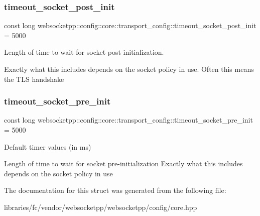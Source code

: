 \subsubsection{\texorpdfstring{timeout\+\_\+socket\+\_\+post\+\_\+init}{timeout\_socket\_post\_init}}
{\footnotesize\ttfamily const long websocketpp\+::config\+::core\+::transport\+\_\+config\+::timeout\+\_\+socket\+\_\+post\+\_\+init = 5000\hspace{0.3cm}{\ttfamily [static]}}



Length of time to wait for socket post-\/initialization. 

Exactly what this includes depends on the socket policy in use. Often this means the T\+LS handshake \mbox{\label{structwebsocketpp_1_1config_1_1core_1_1transport__config_ab35c5322043bee05f2a66444f41a9be9}} 
\subsubsection{\texorpdfstring{timeout\+\_\+socket\+\_\+pre\+\_\+init}{timeout\_socket\_pre\_init}}
{\footnotesize\ttfamily const long websocketpp\+::config\+::core\+::transport\+\_\+config\+::timeout\+\_\+socket\+\_\+pre\+\_\+init = 5000\hspace{0.3cm}{\ttfamily [static]}}



Default timer values (in ms) 

Length of time to wait for socket pre-\/initialization Exactly what this includes depends on the socket policy in use 

The documentation for this struct was generated from the following file\+:\begin{DoxyCompactItemize}
\item 
libraries/fc/vendor/websocketpp/websocketpp/config/core.\+hpp\end{DoxyCompactItemize}

